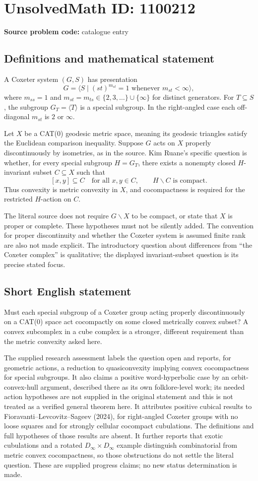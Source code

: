 \documentclass[11pt]{article}
\begin{document}
\section*{UnsolvedMath ID: 1100212}
\textbf{Source problem code:} catalogue entry
\subsection{Definitions and mathematical statement}
A Coxeter system $(G,S)$ has presentation
\[
 G=\langle S\mid (st)^{m_{st}}=1\text{ whenever }m_{st}<\infty\rangle,
\]
where $m_{ss}=1$ and $m_{st}=m_{ts}\in\{2,3,\ldots\}\cup\{\infty\}$ for distinct generators. For $T\subseteq S$, the subgroup $G_T=\langle T\rangle$ is a special subgroup. In the right-angled case each off-diagonal $m_{st}$ is $2$ or $\infty$.

Let $X$ be a CAT(0) geodesic metric space, meaning its geodesic triangles satisfy the Euclidean comparison inequality. Suppose $G$ acts on $X$ properly discontinuously by isometries, as in the source. Kim Ruane's specific question is whether, for every special subgroup $H=G_T$, there exists a nonempty closed $H$-invariant subset $C\subseteq X$ such that
\[
 [x,y]\subseteq C\quad\text{for all }x,y\in C,
 \qquad H\backslash C\text{ is compact}.
\]
Thus convexity is metric convexity in $X$, and cocompactness is required for the restricted $H$-action on $C$.

The literal source does not require $G\backslash X$ to be compact, or state that $X$ is proper or complete. These hypotheses must not be silently added. The convention for proper discontinuity and whether the Coxeter system is assumed finite rank are also not made explicit. The introductory question about differences from ``the Coxeter complex'' is qualitative; the displayed invariant-subset question is its precise stated focus.
\subsection{Short English statement}
Must each special subgroup of a Coxeter group acting properly discontinuously on a CAT(0) space act cocompactly on some closed metrically convex subset? A convex subcomplex in a cube complex is a stronger, different requirement than the metric convexity asked here.

The supplied research assessment labels the question open and reports, for geometric actions, a reduction to quasiconvexity implying convex cocompactness for special subgroups. It also claims a positive word-hyperbolic case by an orbit-convex-hull argument, described there as its own folklore-level work; its needed action hypotheses are not supplied in the original statement and this is not treated as a verified general theorem here. It attributes positive cubical results to Fioravanti--Levcovitz--Sageev (2024), for right-angled Coxeter groups with no loose squares and for strongly cellular cocompact cubulations. The definitions and full hypotheses of those results are absent. It further reports that exotic cubulations and a rotated $D_\infty\times D_\infty$ example distinguish combinatorial from metric convex cocompactness, so those obstructions do not settle the literal question. These are supplied progress claims; no new status determination is made.
\end{document}
